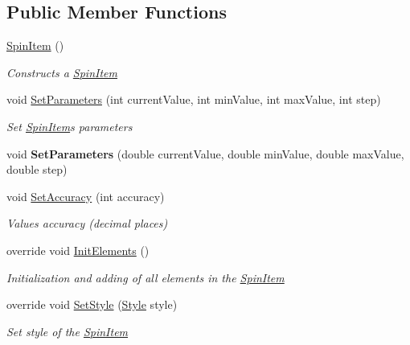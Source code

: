 \subsection*{Public Member Functions}
\begin{DoxyCompactItemize}
\item 
\mbox{\hyperlink{class_space_v_i_l_1_1_spin_item_aad1c32a29142563435b0b222d320fc99}{Spin\+Item}} ()
\begin{DoxyCompactList}\small\item\em Constructs a \mbox{\hyperlink{class_space_v_i_l_1_1_spin_item}{Spin\+Item}} \end{DoxyCompactList}\item 
void \mbox{\hyperlink{class_space_v_i_l_1_1_spin_item_a34da95698ef1ccaf2996afaab479d89a}{Set\+Parameters}} (int current\+Value, int min\+Value, int max\+Value, int step)
\begin{DoxyCompactList}\small\item\em Set \mbox{\hyperlink{class_space_v_i_l_1_1_spin_item}{Spin\+Item}}\textquotesingle{}s parameters \end{DoxyCompactList}\item 
\mbox{\label{class_space_v_i_l_1_1_spin_item_a2833c34bd9d98ca4d37e347ccd9b582a}} 
void {\bfseries Set\+Parameters} (double current\+Value, double min\+Value, double max\+Value, double step)
\item 
void \mbox{\hyperlink{class_space_v_i_l_1_1_spin_item_a75968056339e587c2e163b50b1ec0be2}{Set\+Accuracy}} (int accuracy)
\begin{DoxyCompactList}\small\item\em Values accuracy (decimal places) \end{DoxyCompactList}\item 
override void \mbox{\hyperlink{class_space_v_i_l_1_1_spin_item_aad67ed66e70bac7de49fbe0f7271d0a1}{Init\+Elements}} ()
\begin{DoxyCompactList}\small\item\em Initialization and adding of all elements in the \mbox{\hyperlink{class_space_v_i_l_1_1_spin_item}{Spin\+Item}} \end{DoxyCompactList}\item 
override void \mbox{\hyperlink{class_space_v_i_l_1_1_spin_item_a4a1bd42da119fb072ed70c1026740591}{Set\+Style}} (\mbox{\hyperlink{class_space_v_i_l_1_1_decorations_1_1_style}{Style}} style)
\begin{DoxyCompactList}\small\item\em Set style of the \mbox{\hyperlink{class_space_v_i_l_1_1_spin_item}{Spin\+Item}} \end{DoxyCompactList}\end{DoxyCompactItemize}
